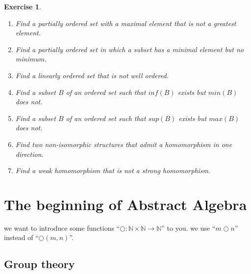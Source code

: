 \documentclass[10pt,a4paper]{book}
\newtheorem{exercise}{Exercise}[section]
\begin{document}
\begin{exercise}
\begin{enumerate}
        \item Find a partially ordered set with a maximal element that is not a greatest element.

        \item Find a partially ordered set in which a subset has a minimal element but no minimum.

        \item Find a linearly ordered set that is not well ordered.

        \item Find a subset $B$ of an ordered set such that
              $inf(B)$ exists but $min(B)$ does not.

        \item Find a subset $B$ of an ordered set such that
              $sup(B)$ exists but $max(B)$ does not.

        \item Find two non-isomorphic structures that admit a homomorphism
              in one direction.

        \item Find a weak homomorphism that is not a strong homomorphism.
    \end{enumerate}


\end{exercise}





\chapter{ The beginning of Abstract Algebra }

we want to introduce some functions ``$\bigcirc :\mathbb{N} \times \mathbb{N}
    \to \mathbb{N}$'' to you. we use ``$m\bigcirc n$'' instead of ``$\bigcirc
    (m,n)$''.
\section{Group theory}
\end{document}
